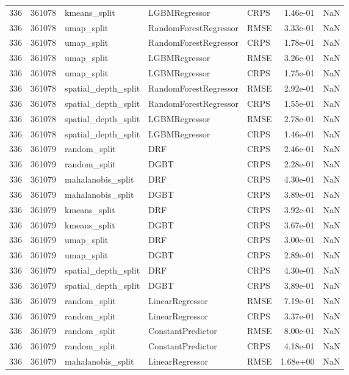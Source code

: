 \begin{tabular}{rrlllrr}
336 & 361078 & kmeans\_split & LGBMRegressor & CRPS & 1.46e-01 & NaN \\
336 & 361078 & umap\_split & RandomForestRegressor & RMSE & 3.33e-01 & NaN \\
336 & 361078 & umap\_split & RandomForestRegressor & CRPS & 1.78e-01 & NaN \\
336 & 361078 & umap\_split & LGBMRegressor & RMSE & 3.26e-01 & NaN \\
336 & 361078 & umap\_split & LGBMRegressor & CRPS & 1.75e-01 & NaN \\
336 & 361078 & spatial\_depth\_split & RandomForestRegressor & RMSE & 2.92e-01 & NaN \\
336 & 361078 & spatial\_depth\_split & RandomForestRegressor & CRPS & 1.55e-01 & NaN \\
336 & 361078 & spatial\_depth\_split & LGBMRegressor & RMSE & 2.78e-01 & NaN \\
336 & 361078 & spatial\_depth\_split & LGBMRegressor & CRPS & 1.46e-01 & NaN \\
336 & 361079 & random\_split & DRF & CRPS & 2.46e-01 & NaN \\
336 & 361079 & random\_split & DGBT & CRPS & 2.28e-01 & NaN \\
336 & 361079 & mahalanobis\_split & DRF & CRPS & 4.30e-01 & NaN \\
336 & 361079 & mahalanobis\_split & DGBT & CRPS & 3.89e-01 & NaN \\
336 & 361079 & kmeans\_split & DRF & CRPS & 3.92e-01 & NaN \\
336 & 361079 & kmeans\_split & DGBT & CRPS & 3.67e-01 & NaN \\
336 & 361079 & umap\_split & DRF & CRPS & 3.00e-01 & NaN \\
336 & 361079 & umap\_split & DGBT & CRPS & 2.89e-01 & NaN \\
336 & 361079 & spatial\_depth\_split & DRF & CRPS & 4.30e-01 & NaN \\
336 & 361079 & spatial\_depth\_split & DGBT & CRPS & 3.89e-01 & NaN \\
336 & 361079 & random\_split & LinearRegressor & RMSE & 7.19e-01 & NaN \\
336 & 361079 & random\_split & LinearRegressor & CRPS & 3.37e-01 & NaN \\
336 & 361079 & random\_split & ConstantPredictor & RMSE & 8.00e-01 & NaN \\
336 & 361079 & random\_split & ConstantPredictor & CRPS & 4.18e-01 & NaN \\
336 & 361079 & mahalanobis\_split & LinearRegressor & RMSE & 1.68e+00 & NaN \\

\end{tabular}
